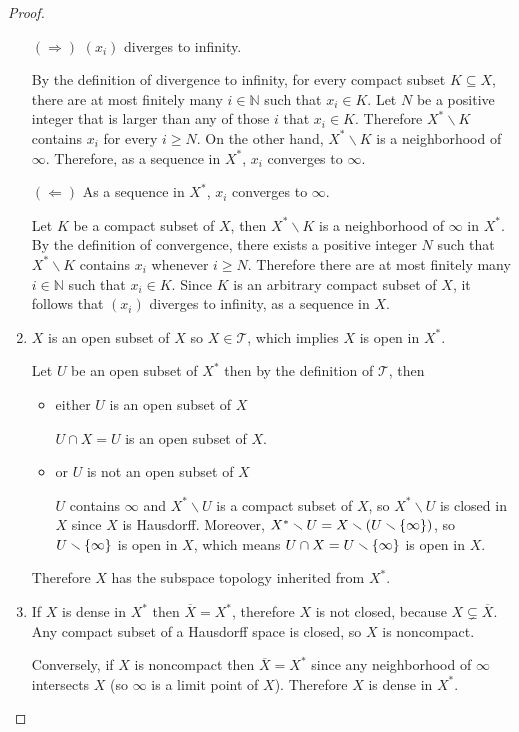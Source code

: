 \begin{proof}
\begin{enumerate}[label={(\alph*)}]
		      $(\Longrightarrow)$ ${(x_{i})}$ diverges to infinity.

		      By the definition of divergence to infinity, for every compact subset $K\subseteq X$, there are at most finitely many $i\in\mathbb{N}$ such that $x_{i} \in K$. Let $N$ be a positive integer that is larger than any of those $i$ that $x_{i} \in K$. Therefore $X^{*}\smallsetminus K$ contains $x_{i}$ for every $i \geq N$. On the other hand, $X^{*}\smallsetminus K$ is a neighborhood of $\infty$. Therefore, as a sequence in $X^{*}$, $x_{i}$ converges to $\infty$.

		      $(\Longleftarrow)$ As a sequence in $X^{*}$, $x_{i}$ converges to $\infty$.

		      Let $K$ be a compact subset of $X$, then $X^{*}\smallsetminus K$ is a neighborhood of $\infty$ in $X^{*}$. By the definition of convergence, there exists a positive integer $N$ such that $X^{*}\smallsetminus K$ contains $x_{i}$ whenever $i\geq N$. Therefore there are at most finitely many $i\in \mathbb{N}$ such that $x_{i} \in K$. Since $K$ is an arbitrary compact subset of $X$, it follows that ${(x_{i})}$ diverges to infinity, as a sequence in $X$.
		\item $X$ is an open subset of $X$ so $X\in\mathscr{T}$, which implies $X$ is open in $X^{*}$.

		      Let $U$ be an open subset of $X^{*}$ then by the definition of $\mathscr{T}$, then
		      \begin{itemize}
			      \item either $U$ is an open subset of $X$

			            $U\cap X = U$ is an open subset of $X$.
			      \item or $U$ is not an open subset of $X$

			            $U$ contains $\infty$ and $X^{*}\smallsetminus U$ is a compact subset of $X$, so $X^{*}\smallsetminus U$ is closed in $X$ since $X$ is Hausdorff. Moreover, $X^{*}\smallsetminus U = X\smallsetminus (U\smallsetminus \left\{{\infty}\right\})$, so $U\smallsetminus \left\{{\infty}\right\}$ is open in $X$, which means $U \cap X = U\smallsetminus \left\{{\infty}\right\}$ is open in $X$.
		      \end{itemize}

		      Therefore $X$ has the subspace topology inherited from $X^{*}$.
		\item If $X$ is dense in $X^{*}$ then $\overline{X} = X^{*}$, therefore $X$ is not closed, because $X \subsetneq \overline{X}$. Any compact subset of a Hausdorff space is closed, so $X$ is noncompact.

		      Conversely, if $X$ is noncompact then $\overline{X} = X^{*}$ since any neighborhood of $\infty$ intersects $X$ (so $\infty$ is a limit point of $X$). Therefore $X$ is dense in $X^{*}$.
	\end{enumerate}
\end{proof}

